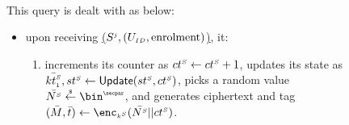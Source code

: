 \begin{figure}[H]
\setlength{\fboxsep}{1pt}
\begin{center}
    \begin{tcolorbox}[enhanced,width=3.3in, left=0.1cm,
    drop fuzzy shadow southwest,
    colframe=black,colback=white]
{\small{

 \\
 
 This query is dealt with as below: 
 
 \begin{itemize}[leftmargin=.4cm]
 \item upon receiving  \underline{\send($S^{\scriptscriptstyle j}, (U_{\scriptscriptstyle ID},  \text{enrolment})$)}, it:
 \begin{enumerate}
 \item  increments its counter as ${ct}^{\scriptscriptstyle S} \gets {ct}^{\scriptscriptstyle S} + 1$, updates its state as $\bar{{kt}^{\scriptscriptstyle S}_{\scriptscriptstyle 1}}, {st}^{\scriptscriptstyle S} \gets \mathsf{Update}({st}^{\scriptscriptstyle S}, {ct}^{\scriptscriptstyle S})$, picks a random value $\bar{\VS{\nonce}} \stackrel{\sss\$}\leftarrow \bin^{\sss\secpar}$, and generates ciphertext and tag   $(\bar M,\bar t) \gets \enc_{\sss\VS{k}}(\bar{\VS{\nonce}}|| \VS{\counter})$. 
 

\end{enumerate}
\end{itemize}}}
\end{tcolorbox}
\end{center}
\end{figure}
